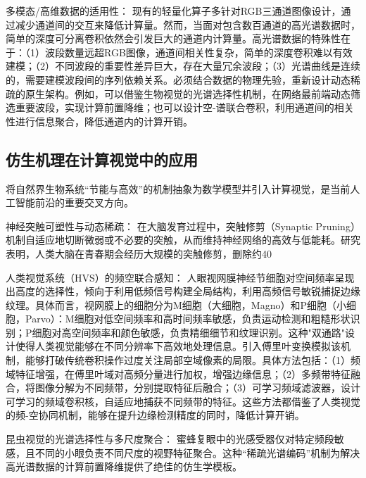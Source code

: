 多模态/高维数据的适用性： 现有的轻量化算子多针对RGB三通道图像设计，通过减少通道间的交互来降低计算量。然而，当面对包含数百通道的高光谱数据时，简单的深度可分离卷积依然会引发巨大的通道内计算量。高光谱数据的特殊性在于：（1）波段数量远超RGB图像，通道间相关性复杂，简单的深度卷积难以有效建模；（2）不同波段的重要性差异巨大，存在大量冗余波段；（3）光谱曲线是连续的，需要建模波段间的序列依赖关系。必须结合数据的物理先验，重新设计动态稀疏的原生架构。例如，可以借鉴生物视觉的光谱选择性机制，在网络最前端动态筛选重要波段，实现计算前置降维；也可以设计空-谱联合卷积，利用通道间的相关性进行信息聚合，降低通道内的计算开销。

\subsection{仿生机理在计算视觉中的应用}
将自然界生物系统“节能与高效”的机制抽象为数学模型并引入计算视觉，是当前人工智能前沿的重要交叉方向。

神经突触可塑性与动态稀疏： 在大脑发育过程中，突触修剪（Synaptic Pruning）机制自适应地切断微弱或不必要的突触，从而维持神经网络的高效与低能耗。研究表明，人类大脑在青春期会经历大规模的突触修剪，删除约40%

人类视觉系统（HVS）的频空联合感知： 人眼视网膜神经节细胞对空间频率呈现出高度的选择性，倾向于利用低频信号构建全局结构，利用高频信号敏锐捕捉边缘纹理。具体而言，视网膜上的细胞分为M细胞（大细胞，Magno）和P细胞（小细胞，Parvo）：M细胞对低空间频率和高时间频率敏感，负责运动检测和粗糙形状识别；P细胞对高空间频率和颜色敏感，负责精细细节和纹理识别。这种"双通路"设计使得人类视觉能够在不同分辨率下高效地处理信息。引入傅里叶变换模拟该机制，能够打破传统卷积操作过度关注局部空域像素的局限。具体方法包括：（1）频域特征增强，在傅里叶域对高频分量进行加权，增强边缘信息；（2）多频带特征融合，将图像分解为不同频带，分别提取特征后融合；（3）可学习频域滤波器，设计可学习的频域卷积核，自适应地捕获不同频带的特征。这些方法都借鉴了人类视觉的频-空协同机制，能够在提升边缘检测精度的同时，降低计算开销。

昆虫视觉的光谱选择性与多尺度聚合： 蜜蜂复眼中的光感受器仅对特定频段敏感，且不同的小眼负责不同尺度的视野特征聚合。这种“稀疏光谱编码”机制为解决高光谱数据的计算前置降维提供了绝佳的仿生学模板。

